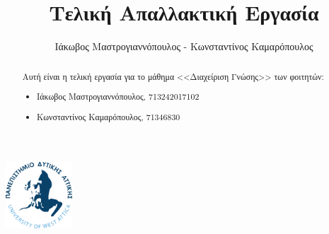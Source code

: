 \documentclass[
  11pt,
  singlespacing,
  liststotoc,
  toctotoc,
  headspline
]{fphw}
\title{Τελική Απαλλακτική Εργασία}
\author{Ιάκωβος Μαστρογιαννόπουλος - Κωνσταντίνος Καμαρόπουλος}
\institute{Πανεπιστημιο Δυτικης Αττικης \\ Τμημα Μηχανικων Πληροφορικης και Υπολογιστων}
\begin{document}
\includegraphics[width=25mm]{Figures/Logo}
\maketitle

\begin{abstract}
  Αυτή είναι η τελική εργασία για το μάθημα <<Διαχείριση Γνώσης>> των φοιτητών:
  \begin{itemize}
      \item Ιάκωβος Μαστρογιαννόπουλος, 713242017102
      \item Κωνσταντίνος Καμαρόπουλος, 71346830
  \end{itemize}
\end{abstract}

\newpage
\tableofcontents
\listoffigures
\listoftables

\newpage

\end{document}
